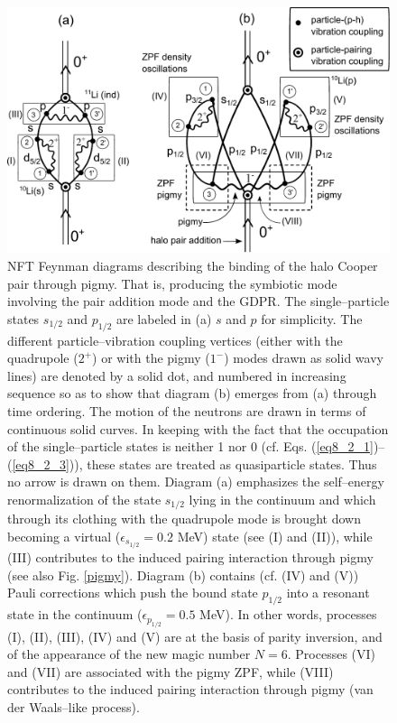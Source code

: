 \begin{subappendices}
   \begin{figure}
   \centerline{\includegraphics*[width=17cm,angle=0]{nutshell/figs/VdW.pdf}}\caption{NFT Feynman diagrams describing the binding of the halo Cooper pair through pigmy. That is, producing the symbiotic mode involving the pair addition mode and the GDPR. The single--particle states $s_{1/2}$ and $p_{1/2}$ are labeled in (a) $s$ and $p$ for simplicity. The different particle--vibration coupling vertices (either with the quadrupole ($2^+$) or with the pigmy ($1^-$) modes drawn as solid wavy lines) are denoted by a solid dot, and numbered in increasing sequence so as to show that diagram (b) emerges from (a) through time ordering. The motion of the neutrons are drawn in terms of continuous solid curves. In keeping with the fact that the occupation of the single--particle states is neither 1 nor 0 (cf. Eqs. (\ref{eq8_2_1})--(\ref{eq8_2_3})), these states are treated as quasiparticle states. Thus no arrow is drawn on them. Diagram (a) emphasizes the self--energy renormalization of the state $s_{1/2}$ lying in the continuum and which   through its clothing with the quadrupole mode is brought down becoming a virtual ($\epsilon_{s_{1/2}}=0.2$ MeV) state (see (I) and (II)), while (III) contributes to the induced pairing interaction through pigmy (see also Fig. \ref{pigmy}). Diagram (b) contains (cf. (IV) and (V)) Pauli corrections which push the bound state $p_{1/2}$ into a resonant state in the continuum ($\epsilon_{p_{1/2}}=0.5$ MeV). In other words, processes (I), (II), (III), (IV) and (V) are at the basis of parity inversion, and of the appearance of the new magic number $N=6$. Processes (VI) and (VII) are associated with the pigmy ZPF, while (VIII) contributes to the induced pairing interaction through pigmy (van der Waals--like process).}
   \end{figure}
 

\end{subappendices}
